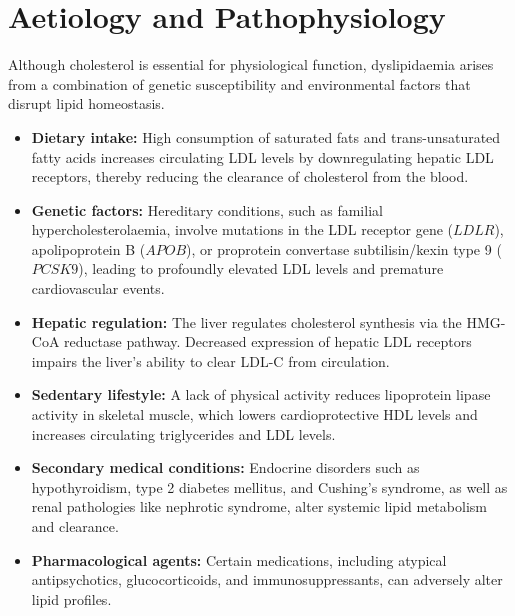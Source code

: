 \section*{Aetiology and Pathophysiology}
Although cholesterol is essential for physiological function, dyslipidaemia arises from a combination of genetic susceptibility and environmental factors that disrupt lipid homeostasis.
\begin{itemize}
    \item \textbf{Dietary intake:} High consumption of saturated fats and trans-unsaturated fatty acids increases circulating LDL levels by downregulating hepatic LDL receptors, thereby reducing the clearance of cholesterol from the blood.
    \item \textbf{Genetic factors:} Hereditary conditions, such as familial hypercholesterolaemia, involve mutations in the LDL receptor gene ($LDLR$), apolipoprotein B ($APOB$), or proprotein convertase subtilisin/kexin type 9 ($PCSK9$), leading to profoundly elevated LDL levels and premature cardiovascular events.
    \item \textbf{Hepatic regulation:} The liver regulates cholesterol synthesis via the HMG-CoA reductase pathway. Decreased expression of hepatic LDL receptors impairs the liver's ability to clear LDL-C from circulation.
    \item \textbf{Sedentary lifestyle:} A lack of physical activity reduces lipoprotein lipase activity in skeletal muscle, which lowers cardioprotective HDL levels and increases circulating triglycerides and LDL levels.
    \item \textbf{Secondary medical conditions:} Endocrine disorders such as hypothyroidism, type 2 diabetes mellitus, and Cushing's syndrome, as well as renal pathologies like nephrotic syndrome, alter systemic lipid metabolism and clearance.
    \item \textbf{Pharmacological agents:} Certain medications, including atypical antipsychotics, glucocorticoids, and immunosuppressants, can adversely alter lipid profiles.
\end{itemize}

